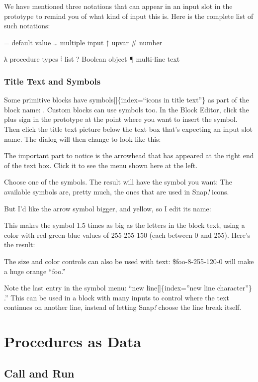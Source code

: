 \documentclass[
  letterpaper,
]{book}
\begin{document}
We have mentioned three notations that can appear in an input slot in
the prototype to remind you of what kind of input this is. Here is the
complete list of such notations:

= default value \ldots{} multiple input ↑ upvar \# number

λ procedure types ⫶ list ? Boolean object ¶ multi-line text

\subsection{Title Text and Symbols}\label{title-text-and-symbols}

Some primitive blocks have symbols{[}{]}\{index=``icons in title
text''\} as part of the block name: . Custom blocks can use symbols too.
In the Block Editor, click the plus sign in the prototype at the point
where you want to insert the symbol. Then click the title text picture
below the text box that's expecting an input slot name. The dialog will
then change to look like this:

The important part to notice is the arrowhead that has appeared at the
right end of the text box. Click it to see the menu shown here at the
left.

Choose one of the symbols. The result will have the symbol you want: The
available symbols are, pretty much, the ones that are used in
Snap\emph{!} icons.

But I'd like the arrow symbol bigger, and yellow, so I edit its name:

This makes the symbol 1.5 times as big as the letters in the block text,
using a color with red-green-blue values of 255-255-150 (each between 0
and 255). Here's the result:

The size and color controls can also be used with text:
\$foo-8-255-120-0 will make a huge orange ``foo.''

Note the last entry in the symbol menu: ``new line{[}{]}\{index=''new
line character''\} .'' This can be used in a block with many inputs to
control where the text continues on another line, instead of letting
Snap\emph{!} choose the line break itself.


\chapter{Procedures as Data}\label{procedures-as-data}

\section{Call and Run}\label{call-and-run}
\end{document}
